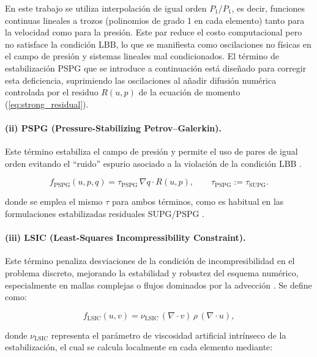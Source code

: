 \documentclass[12pt, letterpaper]{article}
\begin{document}
En este trabajo se utiliza interpolación de igual orden $P_1/P_1$, es decir, funciones continuas lineales a trozos (polinomios de grado 1 en cada elemento) tanto para la velocidad como para la presión. Este par reduce el costo computacional pero no satisface la condición LBB, lo que se manifiesta como oscilaciones no físicas en el campo de presión y sistemas lineales mal condicionados. El término de estabilización PSPG que se introduce a continuación está diseñado para corregir esta deficiencia, suprimiendo las oscilaciones al añadir difusión numérica controlada por el residuo $R(u,p)$ de la ecuación de momento (\ref{eq:strong_residual}).

\paragraph{(ii) PSPG (Pressure-Stabilizing Petrov--Galerkin).}
Este término estabiliza el campo de presión y permite el uso de pares de igual orden evitando el “ruido” espurio asociado a la violación de la condición LBB \cite{pspg}.

\begin{equation}
  \label{eq:pspg_term}
  f_{\mathrm{PSPG}}(u,p,q)
  = \tau_{\mathrm{PSPG}}\, \nabla q \cdot R(u,p),
  \qquad \tau_{\mathrm{PSPG}} := \tau_{\mathrm{SUPG}}.
\end{equation}

\noindent donde se emplea el mismo $\tau$ para ambos términos, como es habitual en las formulaciones estabilizadas residuales SUPG/PSPG \cite{pspg,supg}.

\paragraph{(iii) LSIC (Least-Squares Incompressibility Constraint).}
Este término penaliza desviaciones de la condición de incompresibilidad en el problema discreto, mejorando la estabilidad y robustez del esquema numérico, especialmente en mallas complejas o flujos dominados por la advección \cite{lsic}. Se define como:

\begin{equation}
  \label{eq:lsic_term}
  f_{\mathrm{LSIC}}(u,v)
  = \nu_{\mathrm{LSIC}}\, (\nabla \cdot v)\, \rho\,(\nabla \cdot u),
\end{equation}

\noindent donde $\nu_{\mathrm{LSIC}}$ representa el parámetro de viscosidad artificial intrínseco de la estabilización, el cual se calcula localmente en cada elemento mediante:
\end{document}
